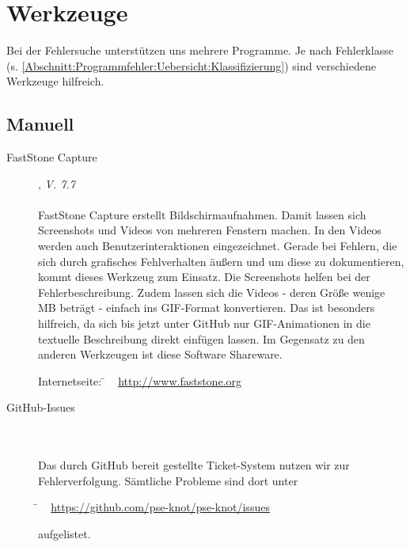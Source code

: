 %



\newpage



\section{Werkzeuge}
\label{Abschnitt:Programmfehler:Werkzeuge}

Bei der Fehlersuche unterstützen uns mehrere Programme.
Je nach Fehlerklasse (s. \ref{Abschnitt:Programmfehler:Uebersicht:Klassifizierung}) sind verschiedene Werkzeuge hilfreich.




\subsection{Manuell}
\label{Abschnitt:Programmfehler:Werkzeuge:Manuell}


\begin{description}

	\item[FastStone Capture], \textit{V. 7.7}\hfill
		\\
		\\
		FastStone Capture erstellt Bildschirmaufnahmen. Damit lassen sich Screenshots und Videos von mehreren Fenstern machen. In den Videos werden auch Benutzerinteraktionen eingezeichnet. Gerade bei Fehlern, die sich durch grafisches Fehlverhalten äußern und um diese zu dokumentieren, kommt dieses Werkzeug zum Einsatz. Die Screenshots helfen bei der Fehlerbeschreibung. Zudem lassen sich die Videos - deren Größe wenige MB beträgt - einfach ins GIF-Format konvertieren. Das ist besonders hilfreich, da sich bis jetzt unter GitHub nur GIF-Animationen in die textuelle Beschreibung direkt einfügen lassen. Im Gegensatz zu den anderen Werkzeugen ist diese Software Shareware.
		
		\begin{tabbing}
			Internetseite:
			\= ~ \href {http://www.faststone.org}
		    	       {http://www.faststone.org}
		    \\
		\end{tabbing}
		
		\item[GitHub-Issues] \hfill
		\\
		\\
		Das durch GitHub bereit gestellte Ticket-System nutzen wir zur Fehlerverfolgung. Sämtliche Probleme sind dort unter
		
		\begin{tabbing}
				\= ~ \href {https://github.com/pse-knot/pse-knot/issues}
    	       			   {https://github.com/pse-knot/pse-knot/issues}
    	       			   
		\end{tabbing} aufgelistet.
		

\end{description}



